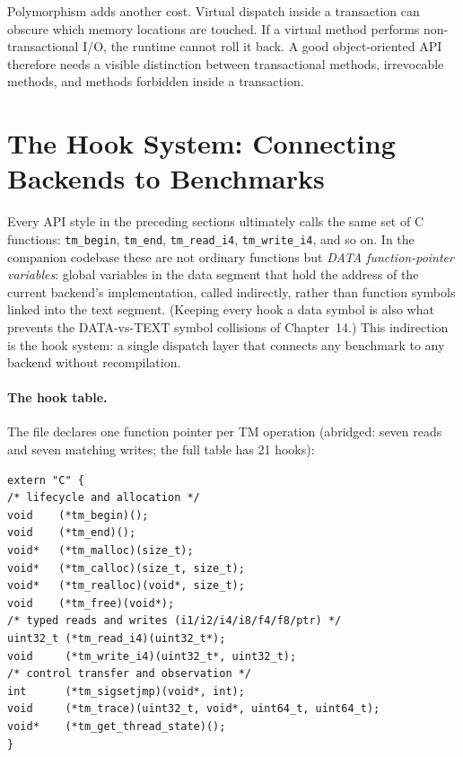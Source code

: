 Polymorphism adds another cost. Virtual dispatch inside a transaction can obscure which memory locations are touched. If a virtual method performs non-transactional I/O, the runtime cannot roll it back. A good object-oriented API therefore needs a visible distinction between transactional methods, irrevocable methods, and methods forbidden inside a transaction.

\section{The Hook System: Connecting Backends to Benchmarks}
\label{sec:hook-system}

Every API style in the preceding sections ultimately calls the same set of
C functions: \texttt{tm\_begin}, \texttt{tm\_end}, \texttt{tm\_read\_i4},
\texttt{tm\_write\_i4}, and so on.  In the companion codebase these are not
ordinary functions but \emph{DATA function-pointer variables}: global
variables in the data segment that hold the address of the current backend's
implementation, called indirectly, rather than function symbols linked into
the text segment.  (Keeping every hook a data symbol is also what prevents
the DATA-vs-TEXT symbol collisions of Chapter~14.)  This indirection is the
hook system: a single dispatch layer that connects any benchmark to any backend
without recompilation.

\paragraph{The hook table.}
The file  declares one function
pointer per TM operation (abridged: seven reads and seven matching writes;
the full table has 21 hooks):

\begin{lstlisting}[caption={The hook variables (\texttt{tm\_hooks.hpp}, abridged).}]
extern "C" {
/* lifecycle and allocation */
void    (*tm_begin)();
void    (*tm_end)();
void*   (*tm_malloc)(size_t);
void*   (*tm_calloc)(size_t, size_t);
void*   (*tm_realloc)(void*, size_t);
void    (*tm_free)(void*);
/* typed reads and writes (i1/i2/i4/i8/f4/f8/ptr) */
uint32_t (*tm_read_i4)(uint32_t*);
void     (*tm_write_i4)(uint32_t*, uint32_t);
/* control transfer and observation */
int      (*tm_sigsetjmp)(void*, int);
void     (*tm_trace)(uint32_t, void*, uint64_t, uint64_t);
void*    (*tm_get_thread_state)();
}
\end{lstlisting}

